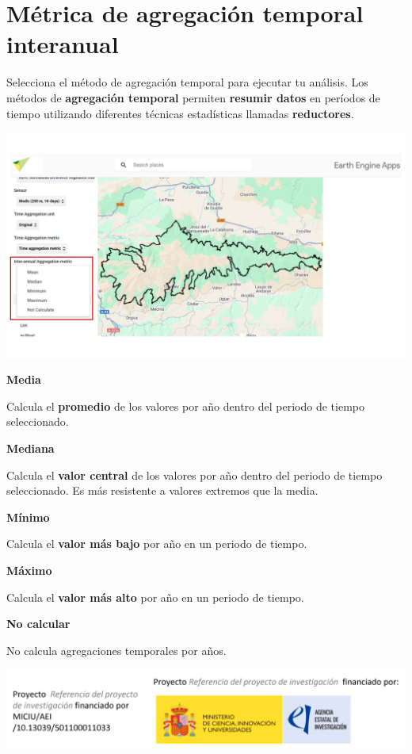\documentclass[
]{book}
\begin{document}
\chapter{Métrica de agregación temporal interanual}\label{agregacion-temporal-interanual}

Selecciona el método de agregación temporal para ejecutar tu análisis. Los métodos de \textbf{agregación temporal} permiten \textbf{resumir datos} en períodos de tiempo utilizando diferentes técnicas estadísticas llamadas \textbf{reductores}.

\includegraphics{assets/interannualAggregation.png}

\textbf{Media}

Calcula el \textbf{promedio} de los valores por año dentro del periodo de tiempo seleccionado.

\textbf{Mediana}

Calcula el \textbf{valor central} de los valores por año dentro del periodo de tiempo seleccionado. Es más resistente a valores extremos que la media.

\textbf{Mínimo}

Calcula el \textbf{valor más bajo} por año en un periodo de tiempo.

\textbf{Máximo}

Calcula el \textbf{valor más alto} por año en un periodo de tiempo.

\textbf{No calcular}

No calcula agregaciones temporales por años.

\includegraphics{assets/logo.jpeg}
\end{document}
